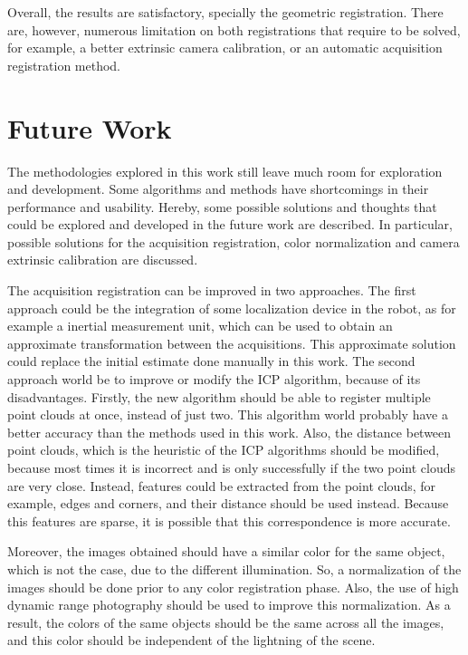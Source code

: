 Overall, the results are satisfactory, specially the geometric registration. There are, however, numerous limitation on both registrations that require to be solved, for example, a better extrinsic camera calibration, or an automatic acquisition registration method.

\section{Future Work}
\label{section:future-work}

The methodologies explored in this work still leave much room for exploration and development. Some algorithms and methods have shortcomings in their performance and usability. Hereby, some possible solutions and thoughts that could be explored and developed in the future work are described. In particular, possible solutions for the acquisition registration, color normalization and camera extrinsic calibration are discussed.

The acquisition registration can be improved in two approaches. The first approach could be the integration of some localization device in the robot, as for example a inertial measurement unit, which can be used to obtain an approximate transformation between the acquisitions. This approximate solution could replace the initial estimate done manually in this work. The second approach world be to improve or modify the ICP algorithm, because of its disadvantages. Firstly, the new algorithm should be able to register multiple point clouds at once, instead of just two. This algorithm world probably have a better accuracy than the methods used in this work. Also, the distance between point clouds, which is the heuristic of the ICP algorithms should be modified, because most times it is incorrect and is only successfully if the two point clouds are very close. Instead, features could be extracted from the point clouds, for example, edges and corners, and their distance should be used instead. Because this features are sparse, it is possible that this correspondence is more accurate.

Moreover, the images obtained should have a similar color for the same object, which is not the case, due to the different illumination. So, a normalization of the images should be done prior to any color registration phase. Also, the use of high dynamic range photography should be used to improve this normalization. As a result, the colors of the same objects should be the same across all the images, and this color should be independent of the lightning of the scene.

